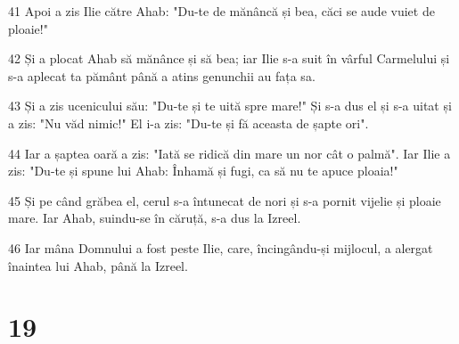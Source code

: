 \par 41 Apoi a zis Ilie către Ahab: "Du-te de mănâncă și bea, căci se aude vuiet de ploaie!"
\par 42 Și a plocat Ahab să mănânce și să bea; iar Ilie s-a suit în vârful Carmelului și s-a aplecat ta pământ până a atins genunchii au fața sa.
\par 43 Și a zis ucenicului său: "Du-te și te uită spre mare!" Și s-a dus el și s-a uitat și a zis: "Nu văd nimic!" El i-a zis: "Du-te și fă aceasta de șapte ori".
\par 44 Iar a șaptea oară a zis: "Iată se ridică din mare un nor cât o palmă". Iar Ilie a zis: "Du-te și spune lui Ahab: Înhamă și fugi, ca să nu te apuce ploaia!"
\par 45 Și pe când grăbea el, cerul s-a întunecat de nori și s-a pornit vijelie și ploaie mare. Iar Ahab, suindu-se în căruță, s-a dus la Izreel.
\par 46 Iar mâna Domnului a fost peste Ilie, care, încingându-și mijlocul, a alergat înaintea lui Ahab, până la Izreel.

\chapter{19}

